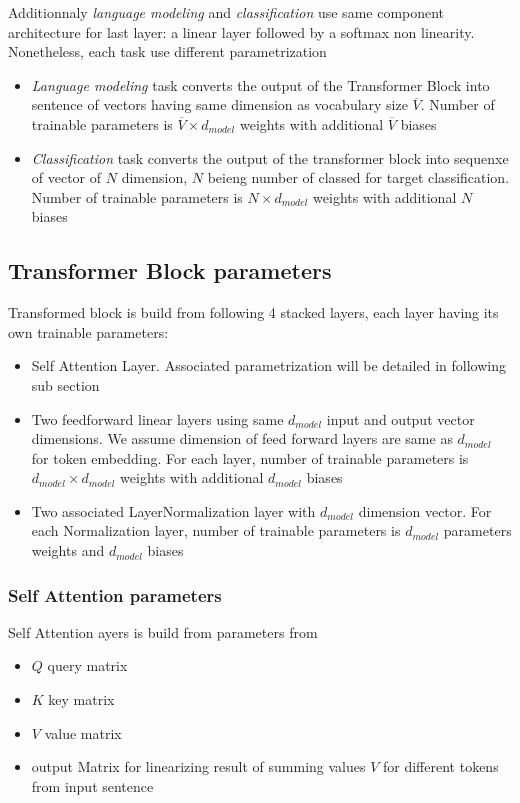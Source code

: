 \documentclass[a4paper]{article}
\begin{document}
Additionnaly \textit{language modeling} and \textit{classification} use same component architecture for last layer: a linear layer followed by a softmax non linearity. Nonetheless, each task use different parametrization
\begin{itemize}
\item \textit{Language modeling} task converts the output of the Transformer Block into sentence of vectors having same dimension as vocabulary size $\overline{V}$. Number of trainable parameters is $\overline{V} \times d_{model}$ weights with additional $\overline{V}$ biases 
\item \textit{Classification} task converts the output of the transformer block into  sequenxe of vector of $N$ dimension, $N$ beieng number of classed for target classification. Number of trainable parameters is $N \times d_{model}$ weights with additional $N$ biases
\end{itemize}

\subsection{Transformer Block parameters}

Transformed block is build from following 4 stacked layers, each layer having its own trainable parameters:
\begin{itemize}
\item Self Attention Layer. Associated parametrization will be detailed in following sub section
\item Two feedforward linear layers using same $d_{model}$ input and output vector dimensions. We assume dimension of feed forward layers are same as $d_{model}$ for token embedding. For each layer, number of trainable parameters is $d_{model} \times d_{model}$ weights with additional $d_{model}$ biases
\item Two associated LayerNormalization layer with $d_{model}$ dimension vector. For each Normalization layer, number of trainable parameters is $d_{model}$ parameters weights and $d_{model}$ biases
\end{itemize}

\subsubsection{Self Attention parameters}

Self Attention ayers is build from parameters from
\begin{itemize}
\item $Q$ query matrix
\item $K$ key matrix
\item $V$ value matrix
\item output Matrix for linearizing result of summing values $V$ for different tokens from input sentence
\end{itemize}
\end{document}
